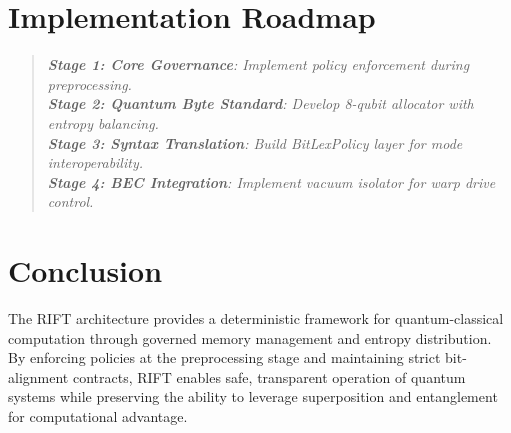 \documentclass[12pt]{article}
\newenvironment{hodos}{\begin{quote}\itshape}{\end{quote}}
\begin{document}
\section{Implementation Roadmap}

\begin{hodos}
\textbf{Stage 1: Core Governance}: Implement policy enforcement during preprocessing.\\[0.5em]
\textbf{Stage 2: Quantum Byte Standard}: Develop 8-qubit allocator with entropy balancing.\\[0.5em]
\textbf{Stage 3: Syntax Translation}: Build BitLexPolicy layer for mode interoperability.\\[0.5em]
\textbf{Stage 4: BEC Integration}: Implement vacuum isolator for warp drive control.
\end{hodos}

\section{Conclusion}
The RIFT architecture provides a deterministic framework for quantum-classical computation through governed memory management and entropy distribution. By enforcing policies at the preprocessing stage and maintaining strict bit-alignment contracts, RIFT enables safe, transparent operation of quantum systems while preserving the ability to leverage superposition and entanglement for computational advantage.
\end{document}
